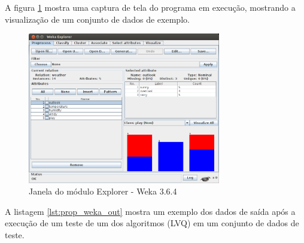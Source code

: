 A figura \ref{fig:prop_weka} mostra uma captura de tela do programa em execução, mostrando a visualização de um conjunto de dados de exemplo.

\begin{figure}[h!]
\centering
\includegraphics[width=0.75\textwidth]{img/weka.png}
\caption{Janela do módulo Explorer - Weka 3.6.4}
\label{fig:prop_weka}
\end{figure}

A listagem \ref{lst:prop_weka_out} mostra um exemplo dos dados de saída após a execução de um teste de um dos algoritmos (LVQ) em um conjunto de dados de teste.

